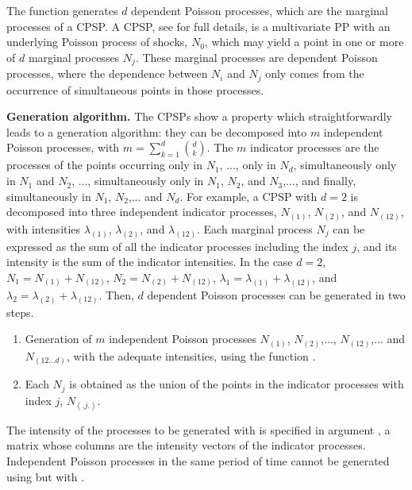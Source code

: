 The function   generates  $d$  dependent  Poisson processes, which are the marginal processes of a CPSP.		A CPSP, see \citet{Abaurrea15} for full details,  is a multivariate PP with  an underlying Poisson process of shocks, $N_0$, which may yield  a point in one or more of  $d$  marginal processes $N_j$. These marginal processes are dependent  Poisson processes, where the dependence between  $N_i$ and $N_j$ only  comes from  the  occurrence of simultaneous points in those processes.




\textbf{Generation algorithm.}
The CPSPs  show a property  which  straightforwardly leads to a generation algorithm: they can be decomposed into $m$  independent Poisson  processes, with $m=\sum_{k=1}^d {d \choose k}$. The $m$ indicator processes  are  the processes of the points occurring only in $N_{1}$, ..., only  in $N_{d}$,   simultaneously only  in $N_{1}$ and $N_2$, ..., simultaneously only  in $N_{1}$, $N_2$, and $N_3$,..., and finally,  simultaneously  in $N_{1}$,  $N_2$,... and $N_d$.  For example, a CPSP with $d=2$ is decomposed into three independent indicator processes, $N_{(1)}$, $N_{(2)}$, and $N_{(12)}$,  with intensities $\lambda_{(1)}$, $\lambda_{(2)}$, and $\lambda_{(12)}$.  Each marginal process  $N_j$ can be   expressed as the sum of all the indicator processes including  the index $j$, and  its intensity  is the sum of the indicator intensities. In the case $d=2$,  $N_{1}=N_{(1)}+ N_{(12)}$, $N_{2}=N_{(2)}+ N_{(12)}$,  $\lambda_1=\lambda_{(1)}+\lambda_{(12)}$, and $\lambda_2=\lambda_{(2)}+\lambda_{(12)}$.   Then,  $d$ dependent  Poisson processes can be generated in two steps. 	




\begin{enumerate}
	\item  Generation of $m$ independent Poisson processes   $N_{(1)}$, $N_{(2)}$,..., $N_{(12)}$,... and $N_{(12...d)}$,  with the  adequate  intensities, using the function .
	
	\item  Each  $N_j$ is obtained as the union of the points in the  indicator processes with index $j$, $N_{(.j.)}$. 
\end{enumerate}




The intensity of the processes to be generated with   is specified in argument ,  a matrix whose columns are the intensity vectors of the indicator  processes.
Independent Poisson processes in the same period of time cannot be generated using  but with .



